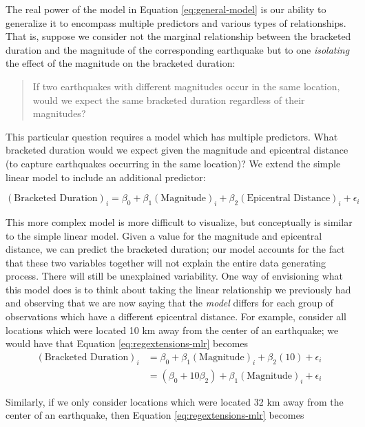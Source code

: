 \documentclass[]{book}
\theoremstyle{plain}
\theoremstyle{mydefn}
\theoremstyle{myexmpl}
\theoremstyle{remark}
\begin{document}
The real power of the model in Equation \eqref{eq:general-model} is our
ability to generalize it to encompass multiple predictors and various
types of relationships. That is, suppose we consider not the marginal
relationship between the bracketed duration and the magnitude of the
corresponding earthquake but to one \emph{isolating} the effect of the
magnitude on the bracketed duration:

\begin{quote}
If two earthquakes with different magnitudes occur in the same location,
would we expect the same bracketed duration regardless of their
magnitudes?
\end{quote}

This particular question requires a model which has multiple predictors.
What bracketed duration would we expect given the magnitude and
epicentral distance (to capture earthquakes occurring in the same
location)? We extend the simple linear model to include an additional
predictor:

\begin{equation}
  (\text{Bracketed Duration})_i = \beta_0 + \beta_1(\text{Magnitude})_i + \beta_2(\text{Epicentral Distance})_i + \epsilon_i
  \label{eq:regextensions-mlr}
\end{equation}

This more complex model is more difficult to visualize, but conceptually
is similar to the simple linear model. Given a value for the magnitude
and epicentral distance, we can predict the bracketed duration; our
model accounts for the fact that these two variables together will not
explain the entire data generating process. There will still be
unexplained variability. One way of envisioning what this model does is
to think about taking the linear relationship we previously had and
observing that we are now saying that the \emph{model} differs for each
group of observations which have a different epicentral distance. For
example, consider all locations which were located 10 km away from the
center of an earthquake; we would have that Equation
\eqref{eq:regextensions-mlr} becomes \[
\begin{aligned}
(\text{Bracketed Duration})_i &= \beta_0 + \beta_1(\text{Magnitude})_i + \beta_2(10) + \epsilon_i \\
  &= \left(\beta_0 + 10\beta_2\right) + \beta_1(\text{Magnitude})_i + \epsilon_i
\end{aligned}
\]

Similarly, if we only consider locations which were located 32 km away
from the center of an earthquake, then Equation
\eqref{eq:regextensions-mlr} becomes
\end{document}

